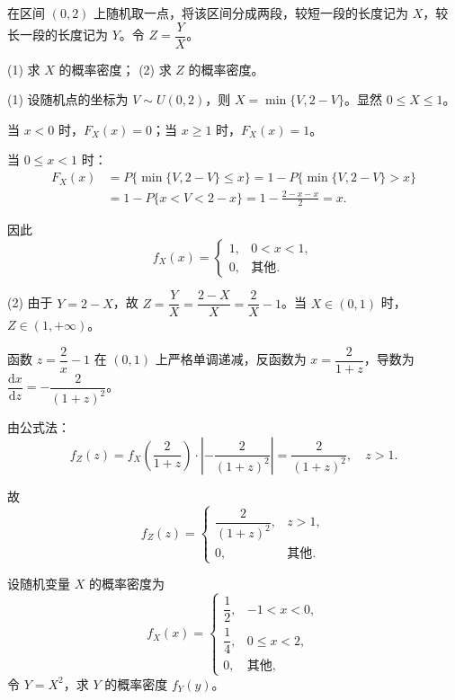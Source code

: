 \documentclass[lang=cn,11pt]{elegantbook}
\begin{document}
\begin{exercise}[分段随机变量的函数] \label{exer:2-21}
在区间 $(0,2)$ 上随机取一点，将该区间分成两段，较短一段的长度记为 $X$，较长一段的长度记为 $Y$。令 $Z = \dfrac{Y}{X}$。

(1) 求 $X$ 的概率密度；
(2) 求 $Z$ 的概率密度。
\end{exercise}

\begin{solution}
(1) 设随机点的坐标为 $V \sim U(0,2)$，则 $X = \min\{V, 2-V\}$。显然 $0 \le X \le 1$。

当 $x < 0$ 时，$F_X(x) = 0$；当 $x \ge 1$ 时，$F_X(x) = 1$。

当 $0 \le x < 1$ 时：
\[
\begin{aligned}
F_X(x) &= P\{\min\{V, 2-V\} \le x\} = 1 - P\{\min\{V, 2-V\} > x\} \\
&= 1 - P\{x < V < 2-x\} = 1 - \frac{2-x-x}{2} = x.
\end{aligned}
\]

因此
\[
f_X(x) = \begin{cases}
1, & 0 < x < 1, \\[4pt]
0, & \text{其他}.
\end{cases}
\]

(2) 由于 $Y = 2 - X$，故 $Z = \dfrac{Y}{X} = \dfrac{2-X}{X} = \dfrac{2}{X} - 1$。当 $X \in (0,1)$ 时，$Z \in (1, +\infty)$。

函数 $z = \dfrac{2}{x} - 1$ 在 $(0,1)$ 上严格单调递减，反函数为 $x = \dfrac{2}{1+z}$，导数为 $\dfrac{\mathrm{d}x}{\mathrm{d}z} = -\dfrac{2}{(1+z)^2}$。

由公式法：
\[
f_Z(z) = f_X\!\left(\frac{2}{1+z}\right) \cdot \left|-\frac{2}{(1+z)^2}\right| = \frac{2}{(1+z)^2}, \quad z > 1.
\]

故
\[
f_Z(z) = \begin{cases}
\dfrac{2}{(1+z)^2}, & z > 1, \\[6pt]
0, & \text{其他}.
\end{cases}
\]
\end{solution}

\begin{exercise}[分段密度函数的变换] \label{exer:2-22}
设随机变量 $X$ 的概率密度为
\[
f_X(x) = \begin{cases}
\dfrac{1}{2}, & -1 < x < 0, \\[6pt]
\dfrac{1}{4}, & 0 \le x < 2, \\[6pt]
0, & \text{其他},
\end{cases}
\]
令 $Y = X^2$，求 $Y$ 的概率密度 $f_Y(y)$。
\end{exercise}
\end{document}
